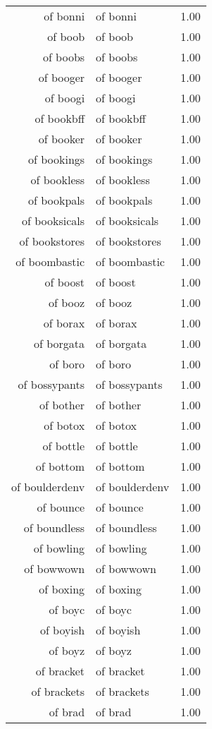 \begin{table}[ht]
\begin{tabular}{rlr}
  of bonni & of bonni & 1.00 \\ 
  of boob & of boob & 1.00 \\ 
  of boobs & of boobs & 1.00 \\ 
  of booger & of booger & 1.00 \\ 
  of boogi & of boogi & 1.00 \\ 
  of bookbff & of bookbff & 1.00 \\ 
  of booker & of booker & 1.00 \\ 
  of bookings & of bookings & 1.00 \\ 
  of bookless & of bookless & 1.00 \\ 
  of bookpals & of bookpals & 1.00 \\ 
  of booksicals & of booksicals & 1.00 \\ 
  of bookstores & of bookstores & 1.00 \\ 
  of boombastic & of boombastic & 1.00 \\ 
  of boost & of boost & 1.00 \\ 
  of booz & of booz & 1.00 \\ 
  of borax & of borax & 1.00 \\ 
  of borgata & of borgata & 1.00 \\ 
  of boro & of boro & 1.00 \\ 
  of bossypants & of bossypants & 1.00 \\ 
  of bother & of bother & 1.00 \\ 
  of botox & of botox & 1.00 \\ 
  of bottle & of bottle & 1.00 \\ 
  of bottom & of bottom & 1.00 \\ 
  of boulderdenv & of boulderdenv & 1.00 \\ 
  of bounce & of bounce & 1.00 \\ 
  of boundless & of boundless & 1.00 \\ 
  of bowling & of bowling & 1.00 \\ 
  of bowwown & of bowwown & 1.00 \\ 
  of boxing & of boxing & 1.00 \\ 
  of boyc & of boyc & 1.00 \\ 
  of boyish & of boyish & 1.00 \\ 
  of boyz & of boyz & 1.00 \\ 
  of bracket & of bracket & 1.00 \\ 
  of brackets & of brackets & 1.00 \\ 
  of brad & of brad & 1.00 \\ 

\end{tabular}
\end{table}
